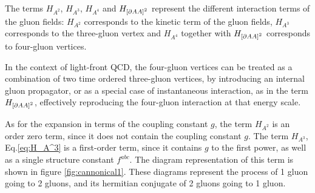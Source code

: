 \documentclass[11pt,a4paper,twoside,pdf]{article}
\numberwithin{equation}{section}
\begin{document}
The terms $H_{A^2}$, $H_{A^3}$, $H_{A^4}$ and $H_{\left[ \partial A A \right]^2}$
represent the different interaction terms of the gluon fields: $H_{A^2}$ corresponds to 
the kinetic term of the gluon fields, $H_{A^3}$ corresponds to the three-gluon
vertex and  $H_{A^4}$ together with $H_{\left[ \partial A A \right]^2}$ corresponds to
four-gluon vertices. 

In the context of light-front QCD, the four-gluon vertices can be treated as a combination of two
time ordered
three-gluon vertices, by introducing an internal gluon propagator, or as a
special case of instantaneous interaction, as in the term $H_{\left[ \partial A A \right]^2}$, 
effectively reproducing the four-gluon interaction at that energy scale. 

As for the expansion in terms of the coupling constant \( g \), the term $H_{A^2}$ is
an order zero term, since it does not contain the coupling constant \( g \).
The term $H_{A^3}$, Eq.\eqref{eq:H_A^3} is a first-order term, since it contains $g$ to the first power,
as well as a single structure constant $f^{abc}$. The diagram representation of this term 
is shown in figure \ref{fig:cannonical1}. These diagrams represent the 
process of 1 gluon going to 2 gluons, and its hermitian conjugate of 2 gluons going to 1 gluon.
\end{document}
